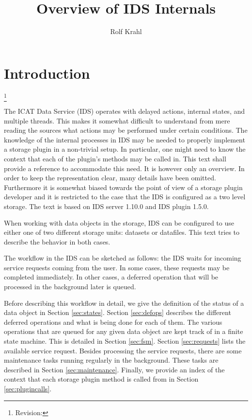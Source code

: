 \documentclass[paper=a4]{scrartcl}
\title{Overview of IDS Internals}
\author{Rolf Krahl}
\newcommand{\revhint}{%
  \begingroup%
  \let\thefootnote\relax%
  \footnote{Revision: }%
  \addtocounter{footnote}{-1}%
  \endgroup%
}
\begin{document}
\maketitle

\section{Introduction}

\revhint{}%
The ICAT Data Service (IDS) operates with delayed actions, internal
states, and multiple threads.  This makes it somewhat difficult to
understand from mere reading the sources what actions may be performed
under certain conditions.  The knowledge of the internal processes in
IDS may be needed to properly implement a storage plugin in a
non-trivial setup.  In particular, one might need to know the context
that each of the plugin's methods may be called in.  This text shall
provide a reference to accommodate this need.  It is however only an
overview.  In order to keep the representation clear, many details
have been omitted.  Furthermore it is somewhat biased towards the
point of view of a storage plugin developer and it is restricted to
the case that the IDS is configured as a two level storage.  The text
is based on IDS server 1.10.0 and IDS plugin 1.5.0.

When working with data objects in the storage, IDS can be configured
to use either one of two different storage units: datasets or
datafiles.  This text tries to describe the behavior in both cases.

The workflow in the IDS can be sketched as follows: the IDS waits for
incoming service requests coming from the user.  In some cases, these
requests may be completed immediately.  In other cases, a deferred
operation that will be processed in the background later is queued.

Before describing this workflow in detail, we give the definition of
the status of a data object in Section \ref{sec:states}.  Section
\ref{sec:defops} describes the different deferred operations and what
is being done for each of them.  The various operations that are
queued for any given data object are kept track of in a finite state
machine.  This is detailed in Section \ref{sec:fsm}.  Section
\ref{sec:requests} lists the available service request.  Besides
processing the service requests, there are some maintenance tasks
running regularly in the background.  These tasks are described in
Section \ref{sec:maintenance}.  Finally, we provide an index of the
context that each storage plugin method is called from in Section
\ref{sec:plugincalls}.
\end{document}
